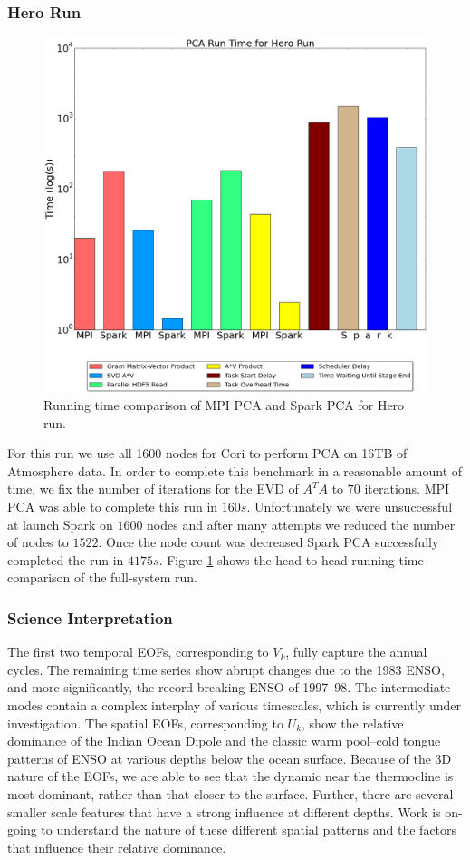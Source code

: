\subsubsection{Hero Run}
\begin{figure}[th]
\includegraphics[width=.5\textwidth]{fig/hero_run_summary.png}
\caption{Running time comparison of MPI PCA and Spark PCA for Hero run.}
\label{fig:hero}
\end{figure}
For this run we use all 1600 nodes for Cori to perform PCA on 16TB of Atmosphere data. In order to complete this benchmark in a reasonable amount of time, we fix  the number of iterations for the EVD of $A^TA$ to $70$ iterations. MPI PCA was able to complete this run in $160s$. Unfortunately we were unsuccessful at launch Spark on $1600$ nodes and after many attempts we reduced the number of nodes to $1522$. Once the node count was decreased Spark PCA successfully completed the run in $4175s$. Figure \ref{fig:hero} shows the head-to-head running time comparison of the full-system run.   

\subsubsection{Science Interpretation}
The first two temporal EOFs, corresponding to $V_k$, fully capture the annual cycles. The remaining time series show abrupt changes due to the 1983 ENSO, and more significantly, the record-breaking ENSO of 1997--98. The intermediate modes contain a complex interplay of various timescales, which is currently under investigation. The spatial EOFs, corresponding to $U_k$, show the relative dominance of the Indian Ocean Dipole and the classic warm pool--cold tongue patterns of ENSO at various depths below the ocean surface. Because of the 3D nature of the EOFs, we are able to see that the dynamic near the thermocline is most dominant, rather than that closer to the surface. Further, there are several smaller scale features that have a strong influence at different depths. Work is on-going to understand the nature of these different spatial patterns and the factors that influence their relative dominance.

